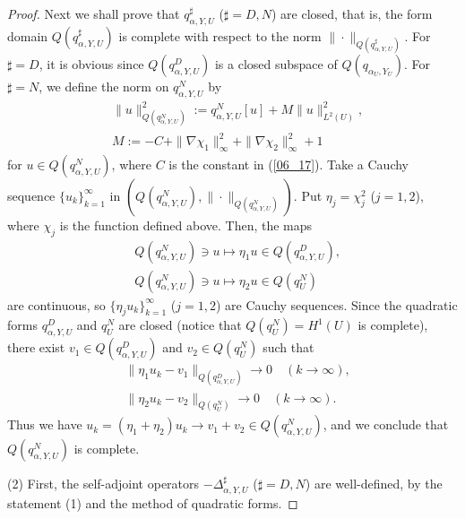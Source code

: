 \documentclass[12pt,a4paper]{article}
\begin{document}
\begin{proof}
Next we shall prove that $q^\sharp_{\alpha,Y,U}$ ($\sharp=D,N$) are closed,
that is,
the form domain $Q(q^\sharp_{\alpha,Y,U})$ is complete with 
respect to the norm $\|\cdot\|_{Q(q^\sharp_{\alpha,Y,U})}$.
For $\sharp=D$, it is obvious since $Q(q^D_{\alpha,Y,U})$
is a closed subspace of $Q(q_{\alpha_U,Y_U})$.
For $\sharp=N$,
we define the norm on $q^N_{\alpha,Y,U}$ by
\begin{align*}
& \|u\|^2_{Q(q^N_{\alpha,Y,U})}
:=
q^N_{\alpha,Y,U}[u]+M\|u\|_{L^2(U)}^2,\\
&
M:=
-C
+\|\nabla\chi_1\|_\infty^2
+\|\nabla\chi_2\|_\infty^2
+1
\end{align*}
for $u\in Q(q^N_{\alpha,Y,U})$,
where $C$ is the constant in (\ref{06_17}).
Take a Cauchy sequence 
$\{u_k\}_{k=1}^\infty$ in 
$(Q(q^N_{\alpha,Y,U}),\|\cdot\|_{Q(q^N_{\alpha,Y,U})})$.
Put $\eta_j=\chi_j^2$ ($j=1,2$),
where $\chi_j$ is the function defined above.
Then, the maps
\begin{align*}
& Q(q^N_{\alpha,Y,U})\ni u \mapsto \eta_1 u\in  Q(q^D_{\alpha,Y,U}),\\
& Q(q^N_{\alpha,Y,U})\ni u \mapsto \eta_2 u\in  Q(q^N_{U})
\end{align*}
are continuous, 
so $\{\eta_j u_k\}_{k=1}^\infty$ ($j=1,2$) are Cauchy sequences.
Since the quadratic forms 
$q^D_{\alpha,Y,U}$
and
$q^N_{U}$
are closed
(notice that
$Q(q^N_{U})=H^1(U)$ is complete),
there exist 
$v_1\in Q(q^D_{\alpha,Y,U})$
and 
$v_2\in Q(q^N_{U})$ such that
\begin{align*}
& \|\eta_1 u_k-v_1\|_{Q(q^D_{\alpha,Y,U})}\to 0\quad (k\to \infty),\\
& \|\eta_2 u_k-v_2\|_{Q(q^N_{U})}\to 0\quad (k\to \infty).
\end{align*}
Thus we have $u_k=(\eta_1+\eta_2)u_k\to v_1+v_2\in Q(q^N_{\alpha,Y,U})$,
and we conclude that $Q(q^N_{\alpha,Y,U})$ is complete.

(2) 
First, the self-adjoint operators $-\Delta^\sharp_{\alpha,Y,U}$ 
($\sharp=D,N$) are well-defined, 
by the statement (1) and the method of quadratic forms.



\end{proof}
\end{document}
